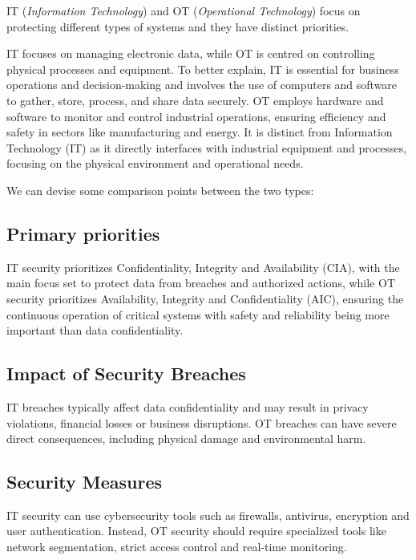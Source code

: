 IT (\textit{Information Technology}) and OT (\textit{Operational Technology}) focus on protecting different types of systems and they have distinct priorities.

IT focuses on managing electronic data, while OT is centred on controlling physical processes and equipment. To better explain, IT is essential for business operations and decision-making and involves the use of computers and software to gather, store, process, and share data securely. OT employs hardware and software to monitor and control industrial operations, ensuring efficiency and safety in sectors like manufacturing and energy. It is distinct from Information Technology (IT) as it directly interfaces with industrial equipment and processes, focusing on the physical environment and operational needs.~\cite{paloalto-it-ot-diff}

We can devise some comparison points between the two types:

\subsection{Primary priorities}

IT security prioritizes Confidentiality, Integrity and Availability (CIA), with the main focus set to protect data from breaches and authorized actions, while OT security prioritizes Availability, Integrity and Confidentiality (AIC), ensuring the continuous operation of critical systems with safety and reliability being more important than data confidentiality.

\subsection{Impact of Security Breaches}

IT breaches typically affect data confidentiality and may result in privacy violations, financial losses or business disruptions. OT breaches can have severe direct consequences, including physical damage and environmental harm.

\subsection{Security Measures}

IT security can use cybersecurity tools such as firewalls, antivirus, encryption and user authentication. Instead, OT security should require specialized tools like network segmentation, strict access control and real-time monitoring.

